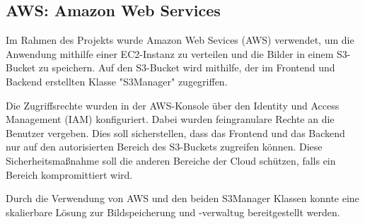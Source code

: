 \subsection{AWS: Amazon Web Services}
Im Rahmen des Projekts wurde Amazon Web Sevices (AWS) verwendet, um die Anwendung mithilfe einer EC2-Instanz zu verteilen
und die Bilder in einem S3-Bucket zu speichern. Auf den S3-Bucket wird mithilfe, der im Frontend und Backend erstellten Klasse "S3Manager" zugegriffen.

Die Zugriffsrechte wurden in der AWS-Konsole über den Identity und Access Management (IAM) konfiguriert. Dabei wurden feingranulare Rechte an die Benutzer 
vergeben. Dies soll sicherstellen, dass das Frontend und das Backend nur auf den autorisierten Bereich des S3-Buckets zugreifen können. Diese Sicherheitsmaßnahme
soll die anderen Bereiche der Cloud schützen, falls ein Bereich kompromittiert wird.

Durch die Verwendung von AWS und den beiden S3Manager Klassen konnte eine skalierbare Lösung zur Bildspeicherung und -verwaltug bereitgestellt werden.